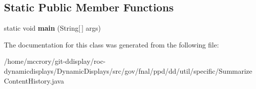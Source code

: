 \subsection*{Static Public Member Functions}
\begin{DoxyCompactItemize}
\item 
\hypertarget{classgov_1_1fnal_1_1ppd_1_1dd_1_1util_1_1specific_1_1SummarizeContentHistory_a6f1c3bb2c85e1ae8a47f2c97600884dd}{static void {\bfseries main} (String\mbox{[}$\,$\mbox{]} args)}\label{classgov_1_1fnal_1_1ppd_1_1dd_1_1util_1_1specific_1_1SummarizeContentHistory_a6f1c3bb2c85e1ae8a47f2c97600884dd}

\end{DoxyCompactItemize}


The documentation for this class was generated from the following file\-:\begin{DoxyCompactItemize}
\item 
/home/mccrory/git-\/ddisplay/roc-\/dynamicdisplays/\-Dynamic\-Displays/src/gov/fnal/ppd/dd/util/specific/Summarize\-Content\-History.\-java\end{DoxyCompactItemize}
